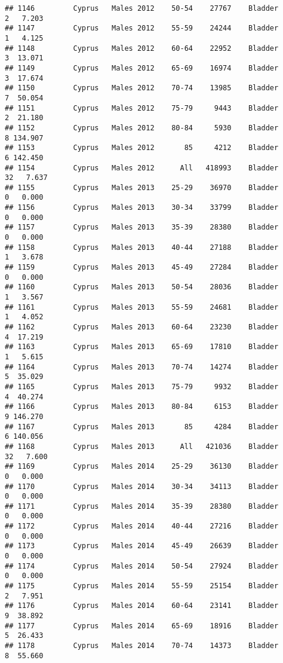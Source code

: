 \documentclass[
]{article}
\begin{document}
\begin{verbatim}
## 1146         Cyprus   Males 2012    50-54    27767    Bladder      2   7.203
## 1147         Cyprus   Males 2012    55-59    24244    Bladder      1   4.125
## 1148         Cyprus   Males 2012    60-64    22952    Bladder      3  13.071
## 1149         Cyprus   Males 2012    65-69    16974    Bladder      3  17.674
## 1150         Cyprus   Males 2012    70-74    13985    Bladder      7  50.054
## 1151         Cyprus   Males 2012    75-79     9443    Bladder      2  21.180
## 1152         Cyprus   Males 2012    80-84     5930    Bladder      8 134.907
## 1153         Cyprus   Males 2012       85     4212    Bladder      6 142.450
## 1154         Cyprus   Males 2012      All   418993    Bladder     32   7.637
## 1155         Cyprus   Males 2013    25-29    36970    Bladder      0   0.000
## 1156         Cyprus   Males 2013    30-34    33799    Bladder      0   0.000
## 1157         Cyprus   Males 2013    35-39    28380    Bladder      0   0.000
## 1158         Cyprus   Males 2013    40-44    27188    Bladder      1   3.678
## 1159         Cyprus   Males 2013    45-49    27284    Bladder      0   0.000
## 1160         Cyprus   Males 2013    50-54    28036    Bladder      1   3.567
## 1161         Cyprus   Males 2013    55-59    24681    Bladder      1   4.052
## 1162         Cyprus   Males 2013    60-64    23230    Bladder      4  17.219
## 1163         Cyprus   Males 2013    65-69    17810    Bladder      1   5.615
## 1164         Cyprus   Males 2013    70-74    14274    Bladder      5  35.029
## 1165         Cyprus   Males 2013    75-79     9932    Bladder      4  40.274
## 1166         Cyprus   Males 2013    80-84     6153    Bladder      9 146.270
## 1167         Cyprus   Males 2013       85     4284    Bladder      6 140.056
## 1168         Cyprus   Males 2013      All   421036    Bladder     32   7.600
## 1169         Cyprus   Males 2014    25-29    36130    Bladder      0   0.000
## 1170         Cyprus   Males 2014    30-34    34113    Bladder      0   0.000
## 1171         Cyprus   Males 2014    35-39    28380    Bladder      0   0.000
## 1172         Cyprus   Males 2014    40-44    27216    Bladder      0   0.000
## 1173         Cyprus   Males 2014    45-49    26639    Bladder      0   0.000
## 1174         Cyprus   Males 2014    50-54    27924    Bladder      0   0.000
## 1175         Cyprus   Males 2014    55-59    25154    Bladder      2   7.951
## 1176         Cyprus   Males 2014    60-64    23141    Bladder      9  38.892
## 1177         Cyprus   Males 2014    65-69    18916    Bladder      5  26.433
## 1178         Cyprus   Males 2014    70-74    14373    Bladder      8  55.660

\end{verbatim}
\end{document}
